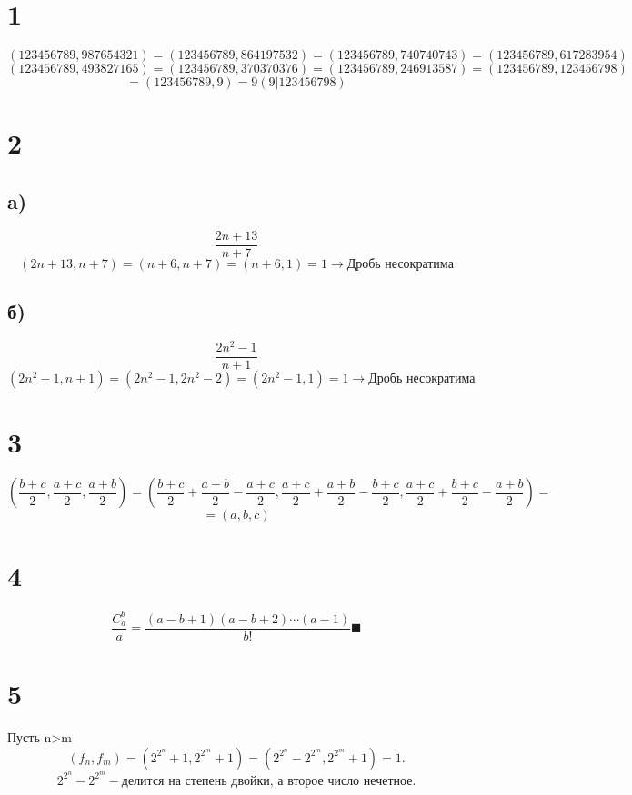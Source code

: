 
\newcommand{\ac}{\frac{a+c}{2}}
\newcommand{\bc}{\frac{b+c}{2}}
\newcommand{\ab}{\frac{a+b}{2}}

	\section*{1}
	$$\left(123456789, 987654321\right) = \left(123456789, 864197532\right)  = \left(123456789, 740740743\right)  = \left(123456789, 617283954\right) $$ 
	$$\left(123456789, 493827165\right) =  \left(123456789, 370370376\right) = \left(123456789, 246913587\right) = \left(123456789, 123456798\right)$$ 
	$$ = \left(123456789, 9\right) = 9(9|123456798)$$
	\section*{2}
	\subsection*{a)}
	$$\frac{2n+13}{n+7}$$ 
	$$\left(2n+13,n+7\right) = \left(n+6,n+7\right) = \left(n+6,1\right) = 1 \to  \text{Дробь несократима}$$
	\subsection*{б)}
	$$\frac{2n^2-1}{n+1}$$
	$$\left(2n^2-1, n+1\right) = (2n^2-1, 2n^2-2) = (2n^2-1,1) = 1 \to \text{Дробь несократима}$$
	\section*{3}
		$$\left(\bc, \ac,\ab\right) = \left(\bc+\ab-\ac, \ac+\ab-\bc, \ac+\bc-\ab \right) = $$ $$=\left(a,b,c \right)$$ 
	\section*{4}
	$$\frac{C_a^b}{a}= \frac{(a-b+1)(a-b+2)\cdots(a-1)}{b!} \blacksquare$$
	\section*{5}
	Пусть n>m
	$$(f_n,f_m) = (2^{2^n}+1,2^{2^m}+1) = (2^{2^n}-2^{2^m}, 2^{2^m}+1) = 1. $$
	$$2^{2^n}-2^{2^m}-\text{делится на степень двойки, а второе число нечетное.}$$
